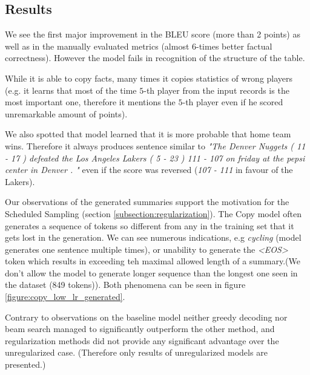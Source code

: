 \subsection{Results}

We see the first major improvement in the BLEU score (more than 2 points) as well as in the manually evaluated metrics (almost $6$-times better factual correctness). However the model fails in recognition of the structure of the table.

While it is able to copy facts, many times it copies statistics of wrong players (e.g. it learns that most of the time $5$-th player from the input records is the most important one, therefore it mentions the $5$-th player even if he scored unremarkable amount of points).

We also spotted that model learned that it is more probable that home team wins. Therefore it always produces sentence similar to \emph{"The Denver Nuggets ( 11 - 17 ) defeated the Los Angeles Lakers ( 5 - 23 ) 111 - 107 on friday at the pepsi center in Denver . "} even if the score was reversed (\emph{107 - 111} in favour of the Lakers).

Our observations of the generated summaries support the motivation for the Scheduled Sampling (section \ref{subsection:regularization}). The Copy model often generates a sequence of tokens so different from any in the training set that it gets lost in the generation. We can see numerous indications, e.g \emph{cycling} (model generates one sentence multiple times), or unability to generate the \emph{\textless EOS\textgreater} token which results in exceeding teh maximal allowed length of a summary.(We don't allow the model to generate longer sequence than the longest one seen in the dataset (849 tokens)). Both phenomena can be seen in figure \ref{figure:copy_low_lr_generated}.

Contrary to observations on the baseline model neither greedy decoding nor beam search managed to significantly outperform the other method, and regularization methods did not provide any significant advantage over the unregularized case. (Therefore only results of unregularized models are presented.)

